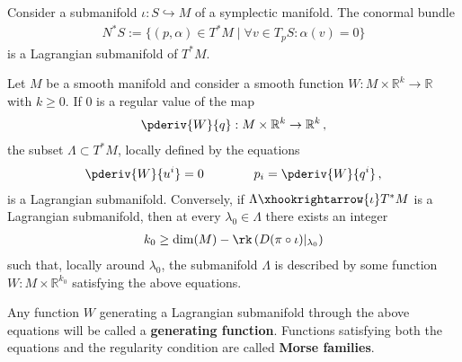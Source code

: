     \begin{example}
        Consider a submanifold $\iota:S\hookrightarrow M$ of a symplectic manifold. The conormal bundle
        \begin{gather}
            N^*S := \{(p,\alpha)\in T^*M\mid\forall v\in T_pS:\alpha(v)=0\}
        \end{gather}
        is a Lagrangian submanifold of $T^*M$.
    \end{example}

    \begin{theorem}\label{symplectic:maslow_hormander}
        Let $M$ be a smooth manifold and consider a smooth function $W:M\times\mathbb{R}^k\rightarrow\mathbb{R}$ with $k\geq 0$. If 0 is a regular value of the map
        \begin{gather}
            \pderiv{W}{q}:M\times\mathbb{R}^k\rightarrow\mathbb{R}^k\,,
        \end{gather}
        the subset $\Lambda\subset T^*M$, locally defined by the equations
        \begin{gather}
            \pderiv{W}{u^i} = 0 \qquad\qquad p_i=\pderiv{W}{q^i}\,,
        \end{gather}
        is a Lagrangian submanifold. Conversely, if $\Lambda\xhookrightarrow{\iota}T^*M$ is a Lagrangian submanifold, then at every $\lambda_0\in\Lambda$ there exists an integer
        \begin{gather}
            k_0\geq\dim(M) - \rk\left(D(\pi\circ\iota)|_{\lambda_0}\right)
        \end{gather}
        such that, locally around $\lambda_0$, the submanifold $\Lambda$ is described by some function $W:M\times\mathbb{R}^{k_0}$ satisfying the above equations.
    \end{theorem}
    Any function $W$ generating a Lagrangian submanifold through the above equations will be called a \textbf{generating function}. Functions satisfying both the equations and the regularity condition are called \textbf{Morse families}.


